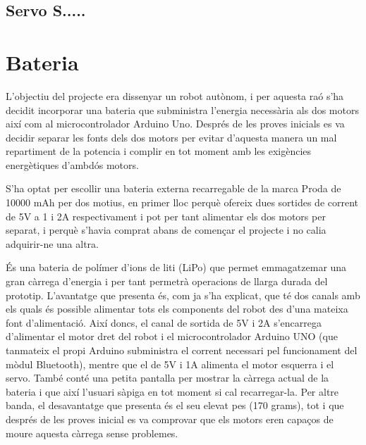 \subsection{Servo S.....}

\section{Bateria}

L’objectiu del projecte era dissenyar un robot autònom, i per aquesta raó s’ha decidit incorporar una bateria que subministra l’energia necessària als dos motors així com al microcontrolador Arduino Uno. Després de les proves inicials es va decidir separar les fonts dels dos motors per evitar d’aquesta manera un mal repartiment de la potencia i complir en tot moment amb les exigències energètiques d’ambdós motors. 

S’ha optat per escollir una bateria externa recarregable de la marca Proda de 10000 mAh per dos motius, en primer lloc perquè ofereix dues sortides de corrent de 5V a 1 i 2A respectivament i pot per tant alimentar els dos motors per separat, i perquè s’havia comprat abans de començar el projecte i no calia adquirir-ne una altra. 

És una bateria de polímer d’ions de liti (LiPo) que permet emmagatzemar una gran càrrega d’energia i per tant permetrà operacions de llarga durada del prototip. L’avantatge que presenta és, com ja s’ha explicat, que té dos canals amb els quals és possible alimentar tots els components del robot des d'una mateixa font d'alimentació. Així doncs, el canal de sortida de 5V i 2A s’encarrega d’alimentar el motor dret del robot i el microcontrolador Arduino UNO (que tanmateix el propi Arduino subministra el corrent necessari pel funcionament del mòdul Bluetooth), mentre que el de 5V i 1A alimenta el motor esquerra i el servo. També conté una petita pantalla per mostrar la càrrega actual de la bateria i que així l’usuari sàpiga en tot moment si cal recarregar-la. Per altre banda, el desavantatge que presenta és el seu elevat pes (170 grams), tot i que després de les proves inicial es va comprovar que els motors eren capaços de moure aquesta càrrega sense problemes. 

